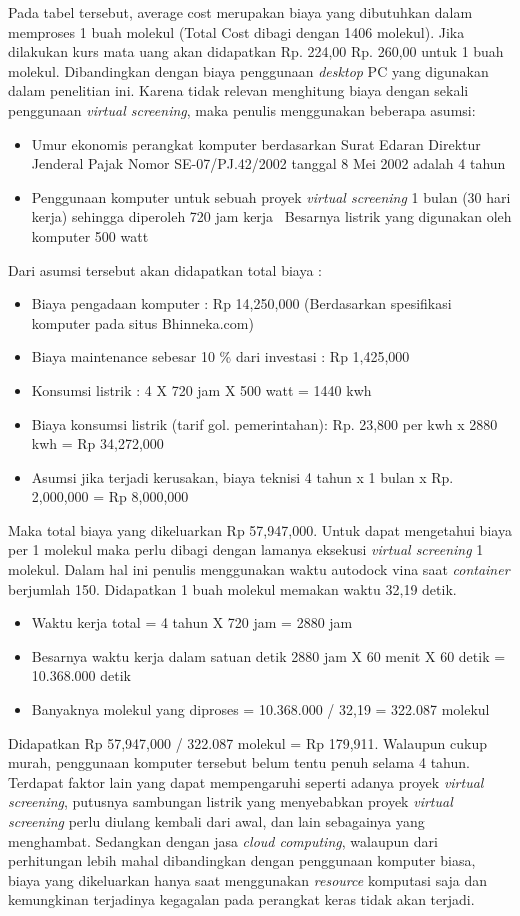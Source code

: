 Pada tabel tersebut, average cost merupakan biaya yang dibutuhkan dalam memproses 1 buah molekul (Total Cost dibagi dengan 1406 molekul). Jika dilakukan kurs mata uang akan didapatkan Rp. 224,00 \textemdash \hspace{0.1 cm}Rp. 260,00 untuk 1 buah molekul. Dibandingkan dengan biaya penggunaan \textit{desktop} PC yang digunakan dalam penelitian ini. Karena tidak relevan menghitung biaya dengan sekali penggunaan \textit{virtual screening}, maka penulis menggunakan beberapa asumsi:
\begin{itemize}
	\item Umur ekonomis perangkat komputer berdasarkan Surat Edaran Direktur Jenderal Pajak Nomor SE-07/PJ.42/2002 tanggal 8 Mei 2002 adalah 4 tahun
	\item Penggunaan komputer untuk sebuah proyek \textit{virtual screening} 1 bulan (30 hari kerja) sehingga diperoleh 720 jam kerja
	\ Besarnya listrik yang digunakan oleh komputer 500 watt 
\end{itemize}
Dari asumsi tersebut akan didapatkan total biaya :
\begin{itemize}
	\item Biaya pengadaan komputer : Rp 14,250,000 (Berdasarkan spesifikasi komputer pada situs Bhinneka.com)
	\item Biaya maintenance sebesar 10 \% dari investasi : Rp 1,425,000
	\item Konsumsi listrik : 4 X 720 jam X 500 watt = 1440 kwh
	\item Biaya konsumsi listrik (tarif gol. pemerintahan): Rp. 23,800 per kwh x 2880 kwh = Rp 34,272,000
	\item Asumsi jika terjadi kerusakan, biaya teknisi 4 tahun x 1 bulan x Rp. 2,000,000 = Rp 8,000,000
\end{itemize}    
Maka total biaya yang dikeluarkan Rp 57,947,000. Untuk dapat mengetahui biaya per 1 molekul maka perlu dibagi dengan lamanya eksekusi \textit{virtual screening} 1 molekul. Dalam hal ini penulis menggunakan waktu autodock vina saat \textit{container} berjumlah 150. Didapatkan 1 buah molekul memakan waktu 32,19 detik.
\begin{itemize}
	\item Waktu kerja total = 4 tahun X 720 jam = 2880 jam
	\item Besarnya waktu kerja dalam satuan detik 2880 jam X 60 menit X 60 detik = 10.368.000 detik
	\item Banyaknya molekul yang diproses = 10.368.000 / 32,19 = 322.087 molekul 
\end{itemize}
Didapatkan Rp 57,947,000 / 322.087 molekul = Rp 179,911. Walaupun cukup murah, penggunaan komputer tersebut belum tentu penuh selama 4 tahun. Terdapat faktor lain yang dapat mempengaruhi seperti adanya proyek \textit{virtual screening}, putusnya sambungan listrik yang menyebabkan proyek \textit{virtual screening} perlu diulang kembali dari awal, dan lain sebagainya yang menghambat. Sedangkan dengan jasa \textit{cloud computing}, walaupun dari perhitungan lebih mahal dibandingkan dengan penggunaan komputer biasa, biaya yang dikeluarkan hanya saat menggunakan \textit{resource} komputasi saja dan kemungkinan terjadinya kegagalan pada perangkat keras tidak akan terjadi.




